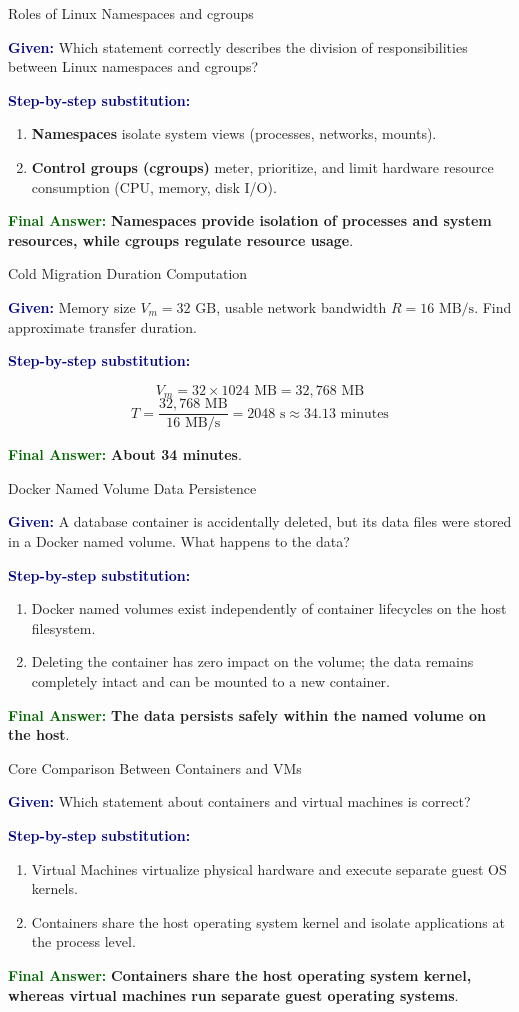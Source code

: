 \documentclass[11pt,a4paper,openany]{report}
\newcommand{\Given}{\par\textbf{\textcolor{navy}{Given:}} }
\newcommand{\Steps}{\par\textbf{\textcolor{navy}{Step-by-step substitution:}}\par}
\newcommand{\Answer}{\par\textbf{\textcolor{darkgreen}{Final Answer:}} }
\begin{document}
\begin{solved}{Roles of Linux Namespaces and cgroups}
\Given Which statement correctly describes the division of responsibilities between Linux namespaces and cgroups?
\Steps
\begin{enumerate}[leftmargin=*]
  \item \textbf{Namespaces} isolate system views (processes, networks, mounts).
  \item \textbf{Control groups (cgroups)} meter, prioritize, and limit hardware resource consumption (CPU, memory, disk I/O).
\end{enumerate}
\Answer \textbf{Namespaces provide isolation of processes and system resources, while cgroups regulate resource usage}.
\end{solved}

\begin{solved}{Cold Migration Duration Computation}
\Given Memory size $V_m = 32\text{ GB}$, usable network bandwidth $R = 16\text{ MB/s}$. Find approximate transfer duration.
\Steps
\begin{equation}
V_m = 32 \times 1024\text{ MB} = 32,768\text{ MB}
\end{equation}
\begin{equation}
T = \frac{32,768\text{ MB}}{16\text{ MB/s}} = 2048\text{ s} \approx 34.13\text{ minutes}
\end{equation}
\Answer \textbf{About 34 minutes}.
\end{solved}

\begin{solved}{Docker Named Volume Data Persistence}
\Given A database container is accidentally deleted, but its data files were stored in a Docker named volume. What happens to the data?
\Steps
\begin{enumerate}[leftmargin=*]
  \item Docker named volumes exist independently of container lifecycles on the host filesystem.
  \item Deleting the container has zero impact on the volume; the data remains completely intact and can be mounted to a new container.
\end{enumerate}
\Answer \textbf{The data persists safely within the named volume on the host}.
\end{solved}

\begin{solved}{Core Comparison Between Containers and VMs}
\Given Which statement about containers and virtual machines is correct?
\Steps
\begin{enumerate}[leftmargin=*]
  \item Virtual Machines virtualize physical hardware and execute separate guest OS kernels.
  \item Containers share the host operating system kernel and isolate applications at the process level.
\end{enumerate}
\Answer \textbf{Containers share the host operating system kernel, whereas virtual machines run separate guest operating systems}.
\end{solved}
\end{document}
